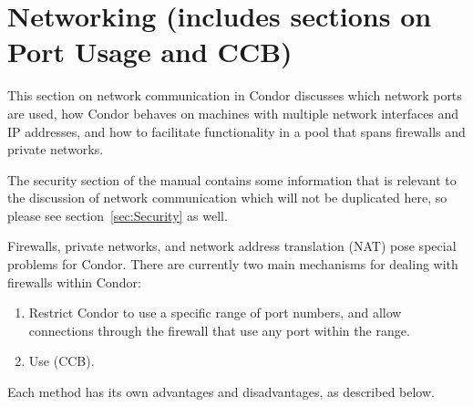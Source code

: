 \section{\label{sec:Networking}Networking (includes sections on Port Usage and CCB)}

This section on
network communication in Condor
discusses which network ports are used,
how Condor behaves on machines with multiple network interfaces
and IP addresses,
and how to facilitate functionality in a pool that spans
firewalls and private networks.

The security section of the manual contains some
information that is relevant to the discussion of network
communication which will not be duplicated here, so please
see section~\ref{sec:Security} as well.

Firewalls, private networks, and network address translation (NAT)
pose special problems for Condor.
There are currently two main mechanisms for dealing with firewalls
within Condor:

\begin{enumerate}

\item Restrict Condor to use a specific range of port numbers, and
  allow connections through the firewall that use any port within the
  range.

\item Use  (CCB).

\end{enumerate}

Each method has its own advantages and disadvantages,
as described below.











